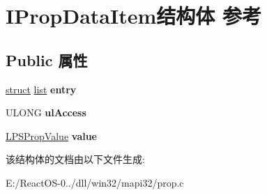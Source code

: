 \hypertarget{struct_i_prop_data_item}{}\section{I\+Prop\+Data\+Item结构体 参考}
\label{struct_i_prop_data_item}
\subsection*{Public 属性}
\begin{DoxyCompactItemize}
\item 
\mbox{\label{struct_i_prop_data_item_ae6c7210f78cec5dfe65cb475276e788a}} 
\hyperlink{interfacestruct}{struct} \hyperlink{classlist}{list} {\bfseries entry}
\item 
\mbox{\label{struct_i_prop_data_item_a02e9ecbdbfbb447807dac7011aab99fe}} 
U\+L\+O\+NG {\bfseries ul\+Access}
\item 
\mbox{\label{struct_i_prop_data_item_aaef825bbea3f062b278acae77f996ebe}} 
\hyperlink{struct___s_prop_value}{L\+P\+S\+Prop\+Value} {\bfseries value}
\end{DoxyCompactItemize}


该结构体的文档由以下文件生成\+:\begin{DoxyCompactItemize}
\item 
E\+:/\+React\+O\+S-\/0../dll/win32/mapi32/prop.\+c\end{DoxyCompactItemize}
